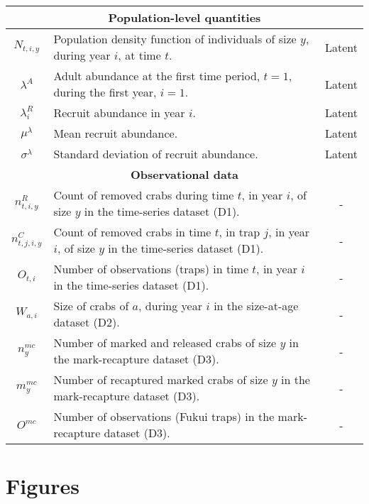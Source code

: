 \documentclass{article}
\begin{document}
\begin{longtable}{||c p{9cm} c||}
 \hline\hline
 \multicolumn{3}{||c||}{\textbf{Population-level quantities}} \\ 
 \hline
 $N_{t,i,y}$ & Population density function of individuals of size $y$, during year $i$, at time $t$. & Latent \\ 
 \hline
 $\lambda^A$ & Adult abundance at the first time period, $t=1$, during the first year, $i=1$. & Latent \\
 \hline
 $\lambda^R_i$ & Recruit abundance in year $i$. & Latent \\
 \hline
 $\mu^{\lambda}$ & Mean recruit abundance. & Latent \\
 \hline
 $\sigma^{\lambda}$ & Standard deviation of recruit abundance. & Latent \\
 \hline\hline
 \multicolumn{3}{||c||}{\textbf{Observational data}} \\ 
 \hline
 $n^R_{t,i,y}$ & Count of removed crabs during time $t$, in year $i$, of size $y$ in the time-series dataset (D1). & - \\ 
 \hline
 $n^C_{t,j,i,y}$ & Count of removed crabs in time $t$, in trap $j$, in year $i$, of size $y$ in the time-series dataset (D1). & - \\
 \hline
 $O_{t,i}$ & Number of observations (traps) in time $t$, in year $i$ in the time-series dataset (D1). & - \\
 \hline
 $W_{a,i}$ & Size of crabs of $a$, during year $i$ in the size-at-age dataset (D2). & - \\
 \hline
 $n^{mc}_{y}$ & Number of marked and released crabs of size $y$ in the mark-recapture dataset (D3). & - \\
 \hline
 $m^{mc}_{y}$ & Number of recaptured marked crabs of size $y$ in the mark-recapture dataset (D3). & - \\
 \hline
 $O^{mc}$ & Number of observations (Fukui traps) in the mark-recapture dataset (D3). & - \\
 \hline
\end{longtable}

\section{Figures}
\end{document}
